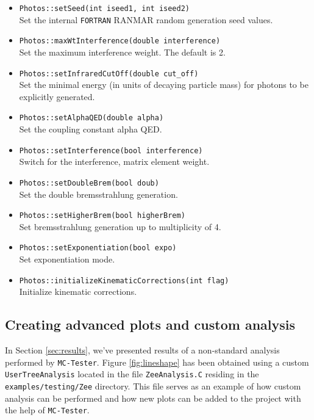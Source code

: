 \documentclass[]{Photos_interface_design}
\begin{document}
\begin{itemize}
  \item {\tt Photos::setSeed(int iseed1, int iseed2)} \\
        Set the internal {\tt FORTRAN} RANMAR random generation seed values.
  \item {\tt Photos::maxWtInterference(double interference)} \\
        Set the maximum interference weight. The default is 2.
  \item {\tt Photos::setInfraredCutOff(double cut\_off)} \\
        Set the minimal energy (in units of decaying particle mass)
        for photons to be explicitly generated.
  \item {\tt Photos::setAlphaQED(double alpha)} \\
        Set the coupling constant alpha QED.
  \item {\tt Photos::setInterference(bool interference)} \\
        Switch for the interference, matrix element weight.
  \item {\tt Photos::setDoubleBrem(bool doub)} \\
        Set the double bremsstrahlung generation.
  \item {\tt Photos::setHigherBrem(bool higherBrem)} \\
        Set bremsstrahlung generation up to multiplicity of 4.
  \item {\tt Photos::setExponentiation(bool expo)} \\
        Set exponentiation mode.
  \item {\tt Photos::initializeKinematicCorrections(int flag)} \\
        Initialize kinematic corrections.
\end{itemize}

\subsection{Creating advanced plots and custom analysis}
\label{App:Plots}


In Section \ref{sec:results}, we've presented results of a non-standard
analysis performed by {\tt MC-Tester}. Figure \ref{fig:lineshape} has been
obtained using a custom {\tt UserTreeAnalysis} located in the file {\tt ZeeAnalysis.C}
residing in the {\tt examples/testing/Zee} directory. This file serves as an
example of how custom analysis can be performed and how new plots can be
added to the project with the help of {\tt MC-Tester}.
\end{document}
